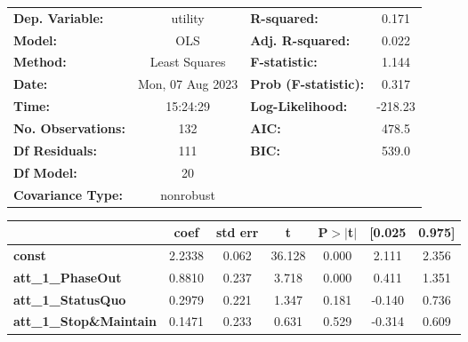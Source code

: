 \begin{center}
\begin{tabular}{lclc}
\toprule
\textbf{Dep. Variable:}                             &     utility      & \textbf{  R-squared:         } &     0.171   \\
\textbf{Model:}                                     &       OLS        & \textbf{  Adj. R-squared:    } &     0.022   \\
\textbf{Method:}                                    &  Least Squares   & \textbf{  F-statistic:       } &     1.144   \\
\textbf{Date:}                                      & Mon, 07 Aug 2023 & \textbf{  Prob (F-statistic):} &    0.317    \\
\textbf{Time:}                                      &     15:24:29     & \textbf{  Log-Likelihood:    } &   -218.23   \\
\textbf{No. Observations:}                          &         132      & \textbf{  AIC:               } &     478.5   \\
\textbf{Df Residuals:}                              &         111      & \textbf{  BIC:               } &     539.0   \\
\textbf{Df Model:}                                  &          20      & \textbf{                     } &             \\
\textbf{Covariance Type:}                           &    nonrobust     & \textbf{                     } &             \\
\bottomrule
\end{tabular}
\begin{tabular}{lcccccc}
                                                    & \textbf{coef} & \textbf{std err} & \textbf{t} & \textbf{P$> |$t$|$} & \textbf{[0.025} & \textbf{0.975]}  \\
\midrule
\textbf{const}                                      &       2.2338  &        0.062     &    36.128  &         0.000        &        2.111    &        2.356     \\
\textbf{att\_1\_PhaseOut}                           &       0.8810  &        0.237     &     3.718  &         0.000        &        0.411    &        1.351     \\
\textbf{att\_1\_StatusQuo}                          &       0.2979  &        0.221     &     1.347  &         0.181        &       -0.140    &        0.736     \\
\textbf{att\_1\_Stop\&Maintain}                     &       0.1471  &        0.233     &     0.631  &         0.529        &       -0.314    &        0.609     \\

\end{tabular}
\end{center}
